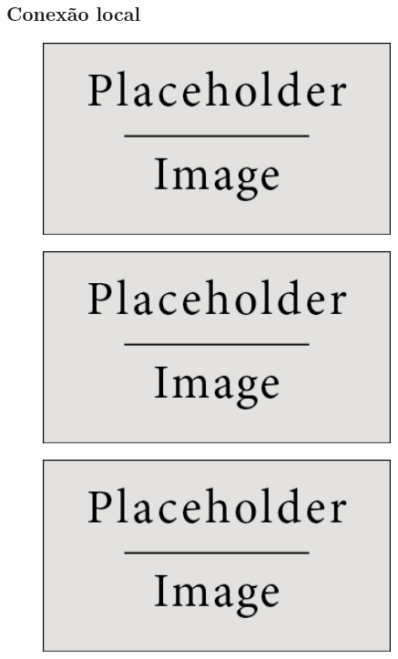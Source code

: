\documentclass[11pt,twoside,a4paper]{report}
\begin{document}
\subsection{Conexão local}
\begin{figure}[H]
	\centering
	\begin{minipage}{.5\textwidth}
		\begin{center}
			\includegraphics[width=0.9\textwidth]{placeholder} %
			\label{fig:local1}
		\end{center}
	\end{minipage}%
	\begin{minipage}{.5\textwidth}
		\begin{center}
			\includegraphics[width=0.9\textwidth]{placeholder} %
			\label{fig:local2}
		\end{center}
	\end{minipage}
	\begin{minipage}{.5\textwidth}
		\begin{center}
			\includegraphics[width=0.9\textwidth]{placeholder} %

\end{center}
\end{minipage}
\end{figure}
\end{document}
